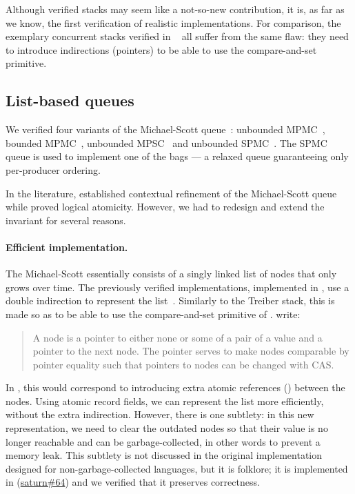 Although verified stacks may seem like a not-so-new contribution, it is, as far as we know, the first verification of realistic \OCaml implementations.
For comparison, the exemplary concurrent stacks verified in \Iris~\citep*{iris-examples} all suffer from the same flaw: they need to introduce indirections (pointers) to be able to use the compare-and-set primitive.

\subsection{List-based queues}

We verified four variants of the Michael-Scott queue~\citep*{DBLP:conf/podc/MichaelS96}: unbounded MPMC~, bounded MPMC~, unbounded MPSC~ and unbounded SPMC~.
The SPMC queue is used to implement one of the bags --- a relaxed queue guaranteeing only per-producer ordering.

In the \Iris literature, \citet*{DBLP:conf/cpp/VindumB21} established contextual refinement of the Michael-Scott queue while \citet*{DBLP:journals/pacmpl/MulderK23} proved logical atomicity.
However, we had to redesign and extend the invariant for several reasons.

\paragraph{Efficient implementation.}\label{par:michael-scott-cleanup}
The Michael-Scott essentially consists of a singly linked list of nodes that only grows over time.
The previously verified implementations, implemented in \HeapLang, use a double indirection to represent the list~\citep[\figurename~2]{DBLP:conf/cpp/VindumB21}.
Similarly to the Treiber stack, this is made so as to be able to use the compare-and-set primitive of \HeapLang. \citet*{DBLP:conf/cpp/VindumB21} write:
\begin{quotation}
  A node is a pointer to either none or some of a pair of a value and a pointer to the next node.
  The pointer serves to make nodes comparable by pointer equality such that pointers to nodes can be changed with CAS.
\end{quotation}
In \OCaml, this would correspond to introducing extra atomic references () between the nodes.
Using atomic record fields, we can represent the list more efficiently, without the extra indirection.
However, there is one subtlety: in this new representation, we need to clear the outdated nodes so that their value is no longer reachable and can be garbage-collected, in other words to prevent a memory leak.
This subtlety is not discussed in the original implementation~\citep*{DBLP:conf/podc/MichaelS96} designed for non-garbage-collected languages, but it is folklore; it is implemented in \Saturn (\href{https://github.com/ocaml-multicore/saturn/pull/64}{saturn\#64}) and we verified that it preserves correctness.

